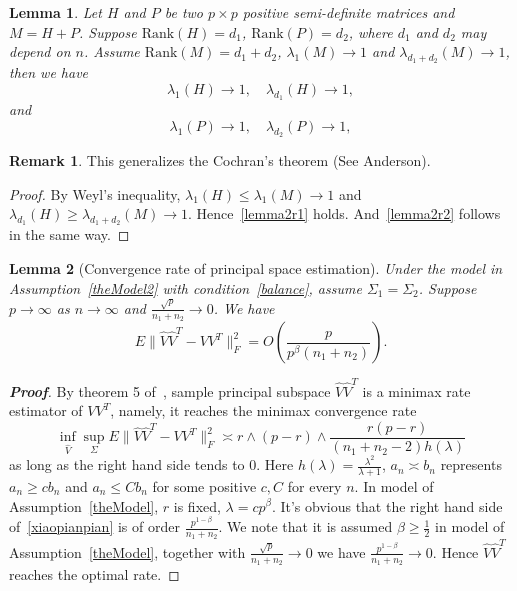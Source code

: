\documentclass[review]{elsarticle}
\theoremstyle{plain}
\newtheorem{lemma}{Lemma}
\theoremstyle{definition}
\newtheorem{remark}{\quad\quad Remark}
\theoremstyle{remark}
\begin{document}
\begin{lemma}\label{lemmaRankLim}
    Let $H$ and $P$ be two $p\times p$ positive semi-definite matrices and $M=H+P$.
    Suppose $\mathrm{Rank}(H)=d_1$, $\mathrm{Rank}(P)=d_2$, where $d_1$ and $d_2$ may depend on $n$. Assume $\mathrm{Rank}(M)=d_1+d_2$, $\lambda_1(M)\to 1$ and $\lambda_{d_1+d_2}(M)\to 1$, then we have
    \begin{equation}\label{lemma2r1}
        \lambda_1 (H)\to 1, \quad \lambda_{d_1} (H)\to 1,
    \end{equation}
    and
    \begin{equation}\label{lemma2r2}
        \lambda_1 (P)\to 1, \quad \lambda_{d_2} (P)\to 1,
    \end{equation}
\end{lemma}
\begin{remark}
    This generalizes the Cochran's theorem (See Anderson).
\end{remark}
\begin{proof}
    By Weyl's inequality, $\lambda_1 (H)\leq \lambda_1 (M)\to 1$ and
    $\lambda_{d_1} (H)\geq \lambda_{d_1+d_2}(M)\to 1$. Hence~\eqref{lemma2r1} holds. And~\eqref{lemma2r2} follows in the same way.
\end{proof}

\begin{lemma}[Convergence rate of principal space estimation]
    Under the model in Assumption~\ref{theModel2} with condition~\eqref{balance}, assume $\Sigma_1=\Sigma_2$. Suppose $p\to \infty$ as $n\to \infty$ and $\frac{\sqrt{p}}{n_1+n_2}\to 0$. We have
\begin{equation*}
E\|\hat{V}\hat{V}^T-VV^T\|^2_F =O(\frac{p}{p^{\beta}(n_1+n_2)}).
\end{equation*}
\end{lemma}


\begin{proof}[\textbf{Proof}]
    By theorem 5 of~\cite{Cai2012Sparse}, sample principal subspace $\hat{V}\hat{V}^T$ is a minimax rate estimator of $VV^T$, namely, it reaches the minimax convergence rate
    \begin{equation}\label{xiaopianpian}
        \inf_{\hat{V}}\sup_{\Sigma} E\|\hat{V}\hat{V}^T-VV^T\|^2_F\asymp r\wedge (p-r)\wedge \frac{r(p-r)}{(n_1+n_2-2)h(\lambda)}
    \end{equation}
    as long as the right hand side tends to $0$. Here $h(\lambda)=\frac{\lambda^2}{\lambda+1}$, $a_n\asymp b_n$ represents $a_n\geq cb_n$ and $a_n\leq Cb_n$ for some positive $c,C$ for every $n$. In model of Assumption~\ref{theModel},  $r$ is fixed, $\lambda=cp^\beta$. It's obvious that the right hand side of~\eqref{xiaopianpian} is of order $\frac{p^{1-\beta}}{n_1+n_2}$. We note that it is assumed $\beta\geq \frac{1}{2}$ in model of
    Assumption~\ref{theModel}, together with $\frac{\sqrt{p}}{n_1+n_2}\to 0$ we have
    $\frac{p^{1-\beta}}{n_1+n_2}\to 0$. Hence
    $\hat{V}\hat{V}^T$ reaches the optimal rate.

\end{proof}
\end{document}

